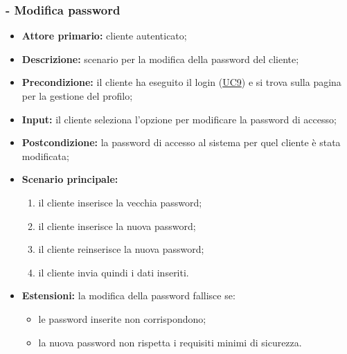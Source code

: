 \stepsubUserCase
\subsubsection{ - Modifica password}
\begin{itemize}
    \item \textbf{Attore primario:} cliente autenticato;
    \item \textbf{Descrizione:} scenario per la modifica della password del cliente;
    \item \textbf{Precondizione:} il cliente ha eseguito il login (\hyperref[UC9]{UC9}) e si trova sulla pagina per la gestione del profilo;
    \item \textbf{Input:} il cliente seleziona l'opzione per modificare la password di accesso;
    \item \textbf{Postcondizione:} la password di accesso al sistema per quel cliente è stata modificata;
    \item \textbf{Scenario principale:}
    \begin{enumerate}
        \item il cliente inserisce la vecchia password;
        \item il cliente inserisce la nuova password;
        \item il cliente reinserisce la nuova password;
        \item il cliente invia quindi i dati inseriti.
    \end{enumerate}
    \item \textbf{Estensioni:} la modifica della password fallisce se:
    \begin{itemize}
        \item le password inserite non corrispondono;
        \item la nuova password non rispetta i requisiti minimi di sicurezza.
    \end{itemize}
\end{itemize}

\stepUserCase
